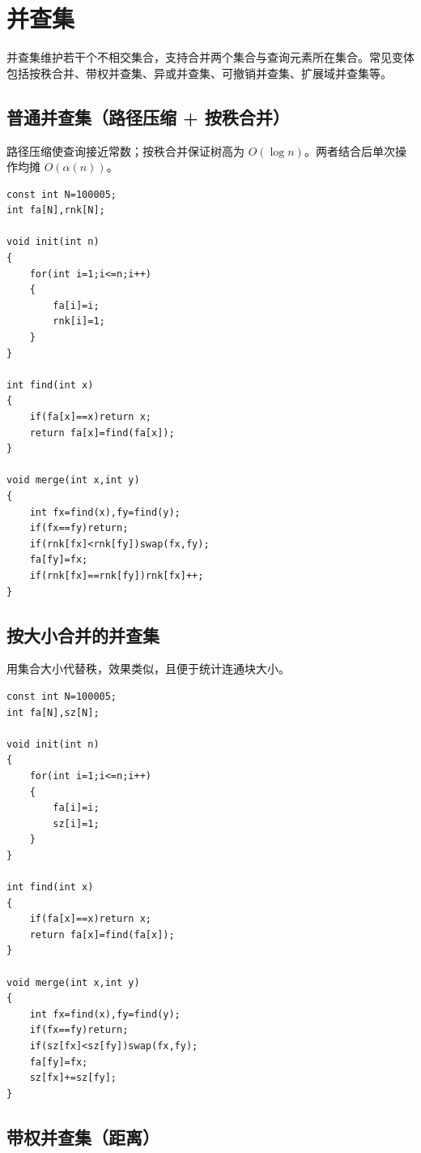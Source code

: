 \section{并查集}

\par \noindent 并查集维护若干个不相交集合，支持合并两个集合与查询元素所在集合。常见变体包括按秩合并、带权并查集、异或并查集、可撤销并查集、扩展域并查集等。

\subsection{普通并查集（路径压缩 + 按秩合并）}

\par \noindent 路径压缩使查询接近常数；按秩合并保证树高为 $O(\log n)$。两者结合后单次操作均摊 $O(\alpha(n))$。

\begin{verbatim}
const int N=100005;
int fa[N],rnk[N];

void init(int n)
{
    for(int i=1;i<=n;i++)
    {
        fa[i]=i;
        rnk[i]=1;
    }
}

int find(int x)
{
    if(fa[x]==x)return x;
    return fa[x]=find(fa[x]);
}

void merge(int x,int y)
{
    int fx=find(x),fy=find(y);
    if(fx==fy)return;
    if(rnk[fx]<rnk[fy])swap(fx,fy);
    fa[fy]=fx;
    if(rnk[fx]==rnk[fy])rnk[fx]++;
}
\end{verbatim}

\subsection{按大小合并的并查集}

\par \noindent 用集合大小代替秩，效果类似，且便于统计连通块大小。

\begin{verbatim}
const int N=100005;
int fa[N],sz[N];

void init(int n)
{
    for(int i=1;i<=n;i++)
    {
        fa[i]=i;
        sz[i]=1;
    }
}

int find(int x)
{
    if(fa[x]==x)return x;
    return fa[x]=find(fa[x]);
}

void merge(int x,int y)
{
    int fx=find(x),fy=find(y);
    if(fx==fy)return;
    if(sz[fx]<sz[fy])swap(fx,fy);
    fa[fy]=fx;
    sz[fx]+=sz[fy];
}
\end{verbatim}

\subsection{带权并查集（距离）}

